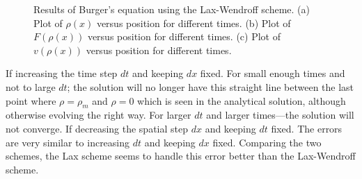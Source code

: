 \begin{figure}[h!]
\begin{subfigure}{.09\textwidth}
\end{subfigure}
\caption{Results of Burger's equation using the Lax-Wendroff scheme. (a) Plot of $\rho(x)$ versus position for different times. (b) Plot of $F(\rho(x))$ versus position for different times. (c) Plot of $v(\rho(x))$ versus position for different times.}
\label{fig:exc2_LW_scheme}
\end{figure}
\FloatBarrier

If increasing the time step $dt$ and keeping $dx$ fixed. For small enough times and not to large $dt$; the solution will no longer have this straight line between the last point where $\rho = \rho_m$ and $\rho = 0$ which is seen in the analytical solution, although otherwise evolving the right way. For larger $dt$ and larger times---the solution will not converge.
If decreasing the spatial step $dx$ and keeping $dt$ fixed. The errors are very similar to increasing $dt$ and keeping $dx$ fixed.
Comparing the two schemes, the Lax scheme seems to handle this error better than the Lax-Wendroff scheme.

